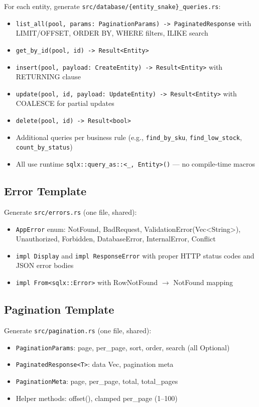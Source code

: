 \documentclass[11pt,a4paper]{article}
\begin{document}
For each entity, generate \texttt{src/database/\{entity\_snake\}\_queries.rs}:
\begin{itemize}
\item \texttt{list\_all(pool, params: PaginationParams) -> PaginatedResponse}
  with LIMIT/OFFSET, ORDER BY, WHERE filters, ILIKE search
\item \texttt{get\_by\_id(pool, id) -> Result<Entity>}
\item \texttt{insert(pool, payload: CreateEntity) -> Result<Entity>}
  with RETURNING clause
\item \texttt{update(pool, id, payload: UpdateEntity) -> Result<Entity>}
  with COALESCE for partial updates
\item \texttt{delete(pool, id) -> Result<bool>}
\item Additional queries per business rule (e.g., \texttt{find\_by\_sku},
  \texttt{find\_low\_stock}, \texttt{count\_by\_status})
\item All use runtime \texttt{sqlx::query\_as::<\_, Entity>()} --- no
  compile-time macros
\end{itemize}

\subsection{Error Template}

Generate \texttt{src/errors.rs} (one file, shared):
\begin{itemize}
\item \texttt{AppError} enum: NotFound, BadRequest, ValidationError(Vec<String>),
  Unauthorized, Forbidden, DatabaseError, InternalError, Conflict
\item \texttt{impl Display} and \texttt{impl ResponseError} with proper
  HTTP status codes and JSON error bodies
\item \texttt{impl From<sqlx::Error>} with RowNotFound $\to$ NotFound mapping
\end{itemize}

\subsection{Pagination Template}

Generate \texttt{src/pagination.rs} (one file, shared):
\begin{itemize}
\item \texttt{PaginationParams}: page, per\_page, sort, order, search (all Optional)
\item \texttt{PaginatedResponse<T>}: data Vec, pagination meta
\item \texttt{PaginationMeta}: page, per\_page, total, total\_pages
\item Helper methods: offset(), clamped per\_page (1--100)
\end{itemize}
\end{document}
